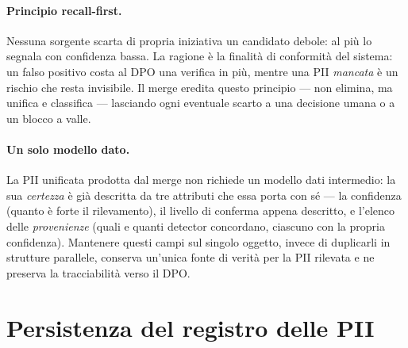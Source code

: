 \paragraph{Principio recall-first.} Nessuna sorgente scarta di propria iniziativa un candidato debole: al più lo segnala con confidenza bassa. La ragione è la finalità di conformità del sistema: un falso positivo costa al DPO una verifica in più, mentre una PII \emph{mancata} è un rischio che resta invisibile. Il merge eredita questo principio --- non elimina, ma unifica e classifica --- lasciando ogni eventuale scarto a una decisione umana o a un blocco a valle.

\paragraph{Un solo modello dato.} La PII unificata prodotta dal merge non richiede un modello dati intermedio: la sua \emph{certezza} è già descritta da tre attributi che essa porta con sé --- la confidenza (quanto è forte il rilevamento), il livello di conferma appena descritto, e l'elenco delle \emph{provenienze} (quali e quanti detector concordano, ciascuno con la propria confidenza). Mantenere questi campi sul singolo oggetto, invece di duplicarli in strutture parallele, conserva un'unica fonte di verità per la PII rilevata e ne preserva la tracciabilità verso il DPO.


\section{Persistenza del registro delle PII}
\label{sec:persistenza-registro}

